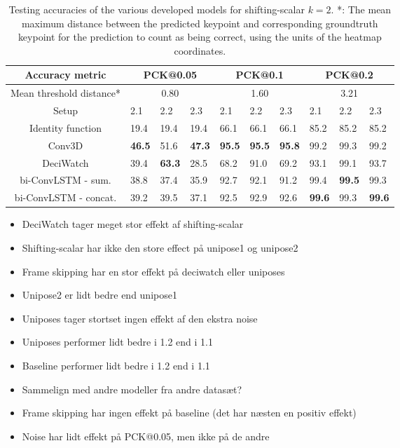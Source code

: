 \documentclass[./main.tex]{subfiles}
\begin{document}
\begin{table}[htbp]
    \begin{tabular}{c||lll|lll|lll}
        \hline
        Accuracy metric & \multicolumn{3}{c}{PCK@0.05} & \multicolumn{3}{c}{PCK@0.1} & \multicolumn{3}{c}{PCK@0.2} \\
        \hline
        Mean threshold distance* & \multicolumn{3}{c}{0.80} & \multicolumn{3}{c}{1.60} & \multicolumn{3}{c}{3.21} \\
        \hline
        Setup & 2.1 & 2.2 & 2.3 & 2.1 & 2.2 & 2.3 & 2.1 & 2.2 & 2.3 \\
        \hline
        \hline
        Identity function & 19.4 & 19.4 & 19.4 & 66.1 & 66.1 & 66.1 & 85.2 & 85.2 & 85.2 \\
        Conv3D & \textbf{46.5} & 51.6 & \textbf{47.3} & \textbf{95.5} & \textbf{95.5} & \textbf{95.8} & 99.2 & 99.3 & 99.2 \\
        DeciWatch & 39.4 & \textbf{63.3} & 28.5 & 68.2 & 91.0 & 69.2 & 93.1 & 99.1 & 93.7 \\
        bi-ConvLSTM - sum. & 38.8 & 37.4 & 35.9 & 92.7 & 92.1 & 91.2 & 99.4 & \textbf{99.5} & 99.3 \\
        bi-ConvLSTM - concat. & 39.2 & 39.5 & 37.1 & 92.5 & 92.9 & 92.6 & \textbf{99.6} & 99.3 & \textbf{99.6} \\
        \hline
    \end{tabular}
    \caption{Testing accuracies of the various developed models for shifting-scalar $k = 2$. *: The mean maximum distance between the predicted keypoint and corresponding groundtruth keypoint for the prediction to count as being correct, using the units of the heatmap coordinates.}
    \label{tab:finetune_test_accs_2}
\end{table}

\begin{itemize}
    \item DeciWatch tager meget stor effekt af shifting-scalar
    \item Shifting-scalar har ikke den store effect på unipose1 og unipose2
    \item Frame skipping har en stor effekt på deciwatch eller uniposes
    \item Unipose2 er lidt bedre end unipose1
    \item Uniposes tager stortset ingen effekt af den ekstra noise
    \item Uniposes performer lidt bedre i 1.2 end i 1.1
    \item Baseline performer lidt bedre i 1.2 end i 1.1
    \item Sammelign med andre modeller fra andre datasæt?
    \item Frame skipping har ingen effekt på baseline (det har næsten en positiv effekt)
    \item Noise har lidt effekt på PCK@0.05, men ikke på de andre
\end{itemize}
\end{document}
